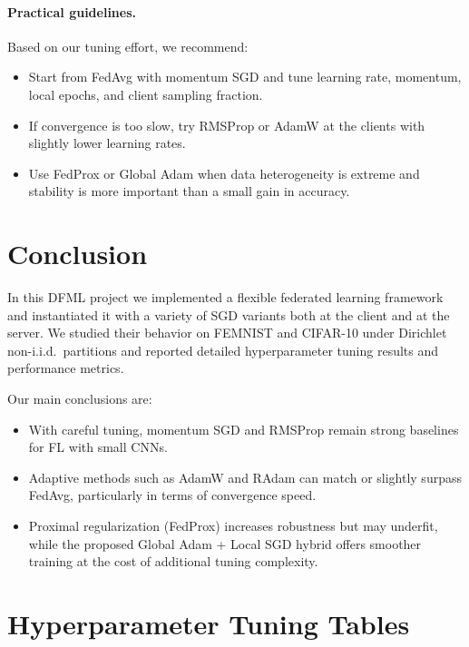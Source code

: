 \documentclass[10pt,twocolumn,letterpaper]{article}
\begin{document}
    \paragraph{Practical guidelines.}
    Based on our tuning effort, we recommend:
    \begin{itemize}
        \item Start from FedAvg with momentum SGD and tune learning rate,
        momentum, local epochs, and client sampling fraction.
        \item If convergence is too slow, try RMSProp or AdamW at the
        clients with slightly lower learning rates.
        \item Use FedProx or Global Adam when data heterogeneity is extreme
        and stability is more important than a small gain in accuracy.
    \end{itemize}

    \section{Conclusion}
    \label{sec:conclusion}

    In this DFML project we implemented a flexible federated learning
    framework and instantiated it with a variety of SGD variants both at the
    client and at the server.
    We studied their behavior on FEMNIST and CIFAR-10 under Dirichlet
    non-i.i.d.\ partitions and reported detailed hyperparameter tuning
    results and performance metrics.

    Our main conclusions are:
    \begin{itemize}
        \item With careful tuning, momentum SGD and RMSProp remain strong
        baselines for FL with small CNNs.
        \item Adaptive methods such as AdamW and RAdam can match or slightly
        surpass FedAvg, particularly in terms of convergence speed.
        \item Proximal regularization (FedProx) increases robustness but may
        underfit, while the proposed Global Adam + Local SGD hybrid offers
        smoother training at the cost of additional tuning complexity.
    \end{itemize}

    
    \onecolumn

    \appendix

    \section{Hyperparameter Tuning Tables}
    \label{sec:appendix}
\end{document}
